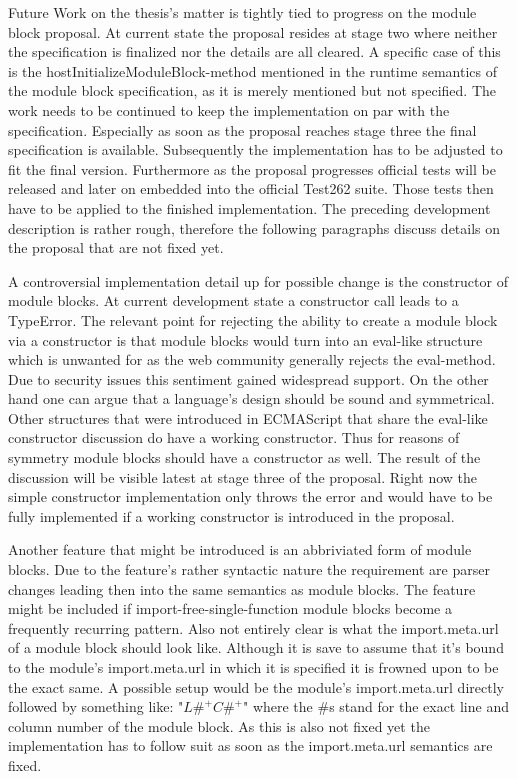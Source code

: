 Future Work on the thesis's matter is tightly tied to progress on the module block proposal. At current state the proposal resides at stage two where neither the specification is finalized nor the details are all cleared. A specific case of this is the hostInitializeModuleBlock-method mentioned in the runtime semantics of the module block specification, as it is merely mentioned but not specified. The work needs to be continued to keep the implementation on par with the specification. Especially as soon as the proposal reaches stage three the final specification is available. Subsequently the implementation has to be adjusted to fit the final version. Furthermore as the proposal progresses official tests will be released and later on embedded into the official Test262 suite. Those tests then have to be applied to the finished implementation. The preceding development description is rather rough, therefore the following paragraphs discuss details on the proposal that are not fixed yet.

A controversial implementation detail up for possible change is the constructor of module blocks. At current development state a constructor call leads to a TypeError. The relevant point for rejecting the ability to create a module block via a constructor is that module blocks would turn into an eval-like structure which is unwanted for as the web community generally rejects the eval-method. Due to security issues this sentiment gained widespread support. On the other hand one can argue that a language's design should be sound and symmetrical. Other structures that were introduced in ECMAScript that share the eval-like constructor discussion do have a working constructor. Thus for reasons of symmetry module blocks should have a constructor as well. The result of the discussion will be visible latest at stage three of the proposal. Right now the simple constructor implementation only throws the error and would have to be fully implemented if a working constructor is introduced in the proposal.

Another feature that might be introduced is an abbriviated form of module blocks. Due to the feature's rather syntactic nature the requirement are parser changes leading then into the same semantics as module blocks. The feature might be included if import-free-single-function module blocks become a frequently recurring pattern. Also not entirely clear is what the import.meta.url of a module block should look like. Although it is save to assume that it's bound to the module's import.meta.url in which it is specified it is frowned upon to be the exact same. A possible setup would be the module's import.meta.url directly followed by something like: "$L\#^+C\#^+$" where the \#s stand for the exact line and column number of the module block. As this is also not fixed yet the implementation has to follow suit as soon as the import.meta.url semantics are fixed.

